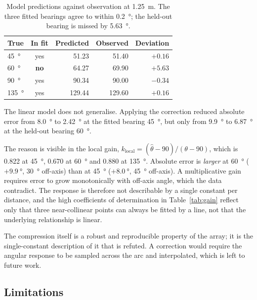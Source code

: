 \begin{table}[htbp]
  \centering
  \caption{Model predictions against observation at \SI{1.25}{\metre}. The
  three fitted bearings agree to within \SI{0.2}{\degree}; the held-out
  bearing is missed by \SI{5.63}{\degree}.}
  \label{tab:validation}
  \begin{tabular}{lcrrr}
    \toprule
    True & In fit & Predicted & Observed & Deviation \\
    \midrule
    \SI{45}{\degree}  & yes & 51.23 & 51.40 & $+0.16$ \\
    \SI{60}{\degree}  & \textbf{no}  & 64.27 & 69.90 & $\mathbf{+5.63}$ \\
    \SI{90}{\degree}  & yes & 90.34 & 90.00 & $-0.34$ \\
    \SI{135}{\degree} & yes & 129.44 & 129.60 & $+0.16$ \\
    \bottomrule
  \end{tabular}
\end{table}

The linear model does not generalise. Applying the correction reduced absolute
error from \SI{8.0}{\degree} to \SI{2.42}{\degree} at the fitted bearing
\SI{45}{\degree}, but only from \SI{9.9}{\degree} to \SI{6.87}{\degree} at the
held-out bearing \SI{60}{\degree}.

The reason is visible in the local gain, $k_{\text{local}} = (\hat{\theta} -
90)/(\theta - 90)$, which is 0.822 at \SI{45}{\degree}, 0.670 at
\SI{60}{\degree} and 0.880 at \SI{135}{\degree}. Absolute error is
\emph{larger} at \SI{60}{\degree} ($+\SI{9.9}{\degree}$, \SI{30}{\degree}
off-axis) than at \SI{45}{\degree} ($+\SI{8.0}{\degree}$, \SI{45}{\degree}
off-axis). A multiplicative gain requires error to grow monotonically with
off-axis angle, which the data contradict. The response is therefore not
describable by a single constant per distance, and the high coefficients of
determination in Table~\ref{tab:gain} reflect only that three near-collinear
points can always be fitted by a line, not that the underlying relationship is
linear.

The compression itself is a robust and reproducible property of the array; it
is the single-constant description of it that is refuted. A correction would
require the angular response to be sampled across the arc and interpolated,
which is left to future work.

\subsection{Limitations}


